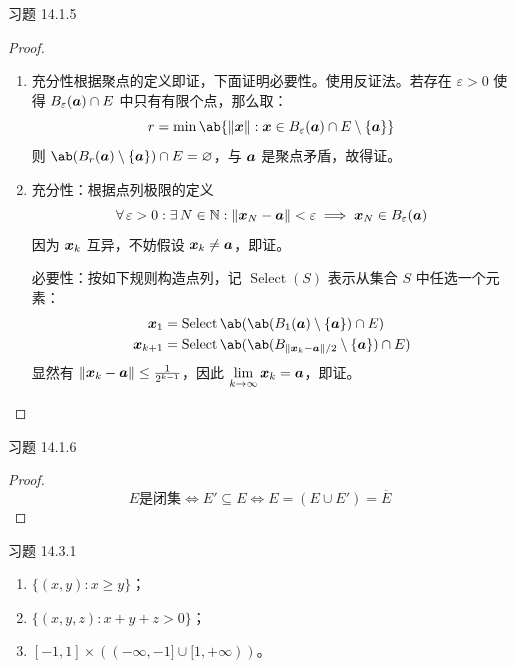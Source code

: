 \begin{problem}
    习题 14.1.5
    \begin{proof}
        \begin{enumerate}
            \item[\textbf{1)}] 充分性根据聚点的定义即证，下面证明必要性。使用反证法。若存在 $\varepsilon > 0$ 使得 $B_{\varepsilon}(\boldsymbol{a}) \cap E$ 中只有有限个点，那么取：
            $$
            r = \min\ab\{\norm{\vect{x}}: \vect{x} \in B_{\varepsilon}(\vect{a}) \cap E \setminus \{\vect{a}\}\}
            $$
            则 $\ab(B_{r}(\vect{a}) \setminus \{\vect{a}\}) \cap E = \varnothing$，与 $\boldsymbol{a}$ 是聚点矛盾，故得证。

            \item[\textbf{2)}] 充分性：根据点列极限的定义
            $$
            \forall\,\varepsilon > 0: \exists\,N \in \mathbb{N}: \norm{\boldsymbol{x}_N - \boldsymbol{a}} < \varepsilon \implies \boldsymbol{x}_N \in B_{\varepsilon}(\boldsymbol{a})
            $$
            因为 $\boldsymbol{x}_k$ 互异，不妨假设 $\boldsymbol{x}_k \neq \boldsymbol{a}$，即证。

            必要性：按如下规则构造点列，记 $\operatorname{Select}(S)$ 表示从集合 $S$ 中任选一个元素：
            $$
            \begin{aligned}
                \vect{x}_1 & = \operatorname{Select}\ab(\ab(B_{1}(\vect{a}) \setminus \{\vect{a}\}) \cap E) \\
                \vect{x}_{k + 1} & = \operatorname{Select}\ab(\ab(B_{\norm{\vect{x}_k - \vect{a}} / 2} \setminus \{\vect{a}\}) \cap E)
            \end{aligned}
            $$
            显然有 $\norm{\boldsymbol{x}_k - \boldsymbol{a}} \le \frac{1}{2^{k - 1}}$，因此 $\lim\limits_{k \to \infty} \boldsymbol{x}_k = \boldsymbol{a}$，即证。
        \end{enumerate}
    \end{proof}
\end{problem}

\begin{problem}
    习题 14.1.6
    \begin{proof}
        $$
        E \text{是闭集} \iff E' \subseteq E \iff E = (E \cup E') = \overline{E}
        $$
    \end{proof}
\end{problem}

\begin{problem}
    习题 14.3.1
    \begin{solution}
        \begin{enumerate}
            \item[\textbf{2)}] $\{(x, y): x \ge y\}$；
            \item[\textbf{4)}] $\{(x, y, z): x + y + z > 0\}$；
            \item[\textbf{6)}] $[-1, 1] \times ((-\infty, -1] \cup [1, +\infty))$。
        \end{enumerate}
    \end{solution}
\end{problem}

